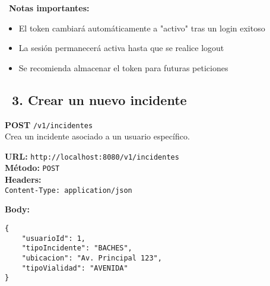 \begin{tcolorbox}[notes]
    \faInfoCircle\ \textbf{Notas importantes:}
    \begin{itemize}
        \item El token cambiará automáticamente a "activo" tras un login exitoso
        \item La sesión permanecerá activa hasta que se realice logout
        \item Se recomienda almacenar el token para futuras peticiones
    \end{itemize}
\end{tcolorbox}

\subsection*{\faServer\ 3. Crear un nuevo incidente}

\begin{tcolorbox}[endpoint]
    \textbf{POST} \texttt{/v1/incidentes}\\
    Crea un incidente asociado a un usuario específico.
\end{tcolorbox}

\begin{tcolorbox}[request]
    \textbf{URL:} \textcolor{urlColor}{\texttt{http://localhost:8080/v1/incidentes}}\\
    \textbf{Método:} \textcolor{methodColor}{\texttt{POST}}\\
    \textbf{Headers:}\\
    \textcolor{headerColor}{\texttt{Content-Type: application/json}}
    
    \textbf{Body:}
    \begin{verbatim}
{
    "usuarioId": 1,
    "tipoIncidente": "BACHES",
    "ubicacion": "Av. Principal 123",
    "tipoVialidad": "AVENIDA"
}
    \end{verbatim}
\end{tcolorbox}

